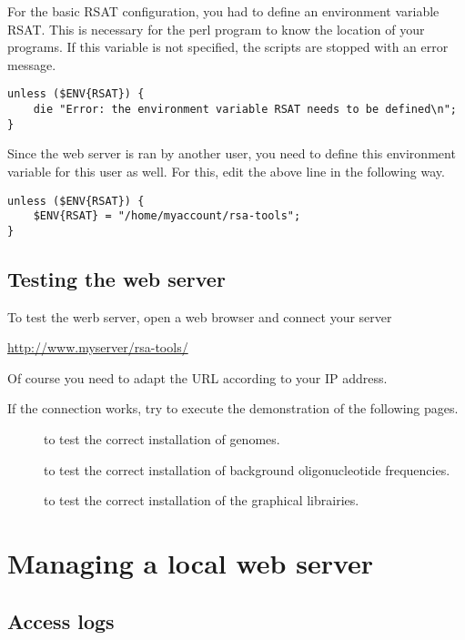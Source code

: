 \documentclass[12pt,a4paper, twoside]{scrreprt} %
\begin{document}
For the basic RSAT configuration, you had to define an environment
variable RSAT. This is necessary for the perl program to know the
location of your programs. If this variable is not specified, the
scripts are stopped with an error message.

\begin{verbatim}
unless ($ENV{RSAT}) {
    die "Error: the environment variable RSAT needs to be defined\n";
}
\end{verbatim}

Since the web server is ran by another user, you need to define this
environment variable for this user as well. For this, edit the
above line in the following way.

\begin{verbatim}
unless ($ENV{RSAT}) {
    $ENV{RSAT} = "/home/myaccount/rsa-tools";
}
\end{verbatim}


\subsection{Testing the web server}

To test the werb server, open a web browser and connect your \RSAT server

\url{http://www.myserver/rsa-tools/} 

Of course you  need to adapt the URL according to your IP address.

If the connection works, try to execute the demonstration of the
following pages.

\begin{description}
\item[] to test the correct installation of genomes. 

\item[] to test the correct installation of
background oligonucleotide frequencies.

\item[] to test the correct installation of the
graphical librairies.

\end{description}

\section{Managing a local web server}

\subsection{Access logs}
\end{document}

